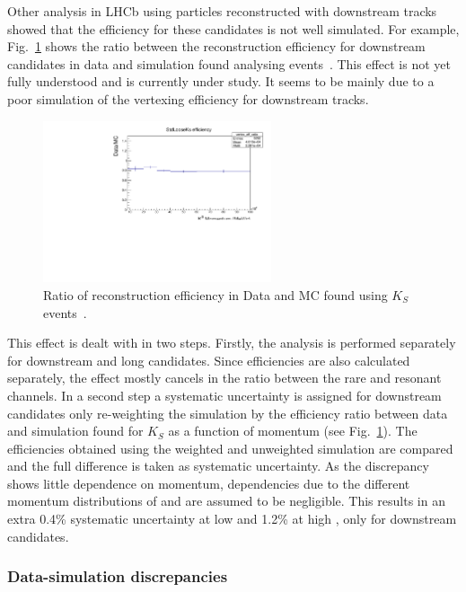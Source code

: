 Other analysis in LHCb using particles reconstructed with downstream tracks showed that
the efficiency for these candidates is not well simulated.
For example, Fig.~\ref{KS_vtxeff} shows the ratio between the reconstruction efficiency for downstream candidates
in data and simulation found analysing \KS events~\cite{Blake:1631348}. This effect is not
yet fully understood and is currently under study. It seems to be mainly due to a poor simulation
of the vertexing efficiency for downstream tracks.
%
\begin{figure}
\centering
\includegraphics[width=0.6\textwidth]{Lmumu/figs/DDvtx_eff_POwen.pdf}
\caption{Ratio of reconstruction efficiency in Data and MC found using $K_S$ events~\cite{Blake:1631348}.}
\label{KS_vtxeff}
\end{figure}
%
This effect is dealt with in two steps. Firstly, the analysis is performed separately for downstream and long candidates.
Since efficiencies are also calculated separately, the effect mostly cancels in the ratio between the
rare and resonant channels. In a second step a systematic uncertainty is assigned for downstream candidates only
re-weighting the simulation by the efficiency ratio between data and simulation
found for $K_S$ as a function of momentum (see Fig.~\ref{KS_vtxeff}). The efficiencies obtained using
the weighted and unweighted simulation are compared and the full difference is taken as systematic uncertainty. 
As the discrepancy shows little dependence on momentum, dependencies due to the different momentum 
distributions of \Lz and \KS are assumed to be negligible. This results in an extra 0.4\% systematic uncertainty
at low \qsq and 1.2\% at high \qsq, only for downstream candidates.

\subsubsection{Data-simulation discrepancies}

